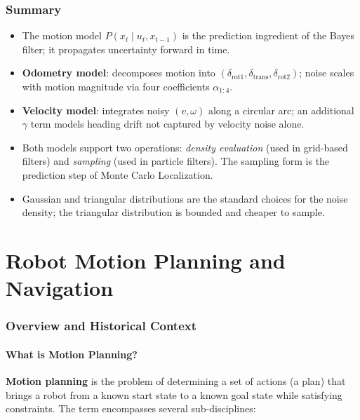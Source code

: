 \documentclass[11pt,a4paper]{article}
\theoremstyle{definition}
\theoremstyle{plain}
\theoremstyle{remark}
\begin{document}
\section{Summary}

\begin{itemize}
    \item The motion model $P(x_t \mid u_t, x_{t-1})$ is the prediction ingredient of the Bayes filter; it propagates uncertainty forward in time.
    \item \textbf{Odometry model}: decomposes motion into $(\delta_{\mathrm{rot1}}, \delta_{\mathrm{trans}}, \delta_{\mathrm{rot2}})$; noise scales with motion magnitude via four coefficients $\alpha_{1:4}$.
    \item \textbf{Velocity model}: integrates noisy $(v, \omega)$ along a circular arc; an additional $\gamma$ term models heading drift not captured by velocity noise alone.
    \item Both models support two operations: \emph{density evaluation} (used in grid-based filters) and \emph{sampling} (used in particle filters). The sampling form is the prediction step of Monte Carlo Localization.
    \item Gaussian and triangular distributions are the standard choices for the noise density; the triangular distribution is bounded and cheaper to sample.
\end{itemize}

\part{Robot Motion Planning and Navigation}

\section{Overview and Historical Context}

\subsection{What is Motion Planning?}

\textbf{Motion planning} is the problem of determining a set of actions (a plan) that brings a robot from a known start state to a known goal state while satisfying constraints. The term encompasses several sub-disciplines:
\end{document}
